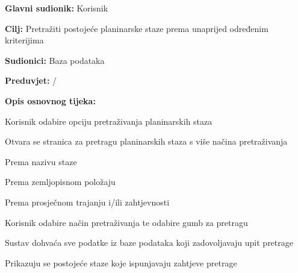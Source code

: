 			\noindent {}
		\begin{packed_item}
			
			\item \textbf{Glavni sudionik: }$ $Korisnik$ $
			\item  \textbf{Cilj:} $ $Pretražiti postojeće planinarske staze prema unaprijed određenim kriterijima $ $
			\item  \textbf{Sudionici:} $ $Baza podataka$ $
			\item  \textbf{Preduvjet:} $ $/$ $
			\item  \textbf{Opis osnovnog tijeka:}
			
			\item[] \begin{packed_enum}
				
				\item $ $Korisnik odabire opciju pretraživanja planinarskih staza$ $
				\item $ $Otvara se stranica za pretragu planinarskih staza s više načina pretraživanja$ $
					\begin{packed_enum}
						\item Prema nazivu staze
						\item Prema zemljopisnom položaju
						\item Prema prosječnom trajanju i/ili zahtjevnosti
					\end{packed_enum}
				\item $ $Korisnik odabire način pretraživanja te odabire gumb za pretragu$ $
				\item $ $Sustav dohvaća sve podatke iz baze podataka koji zadovoljavaju upit pretrage $ $
				\item $ $Prikazuju se postojeće staze koje ispunjavaju zahtjeve pretrage$ $
				
			\end{packed_enum}
		\end{packed_item}
		
